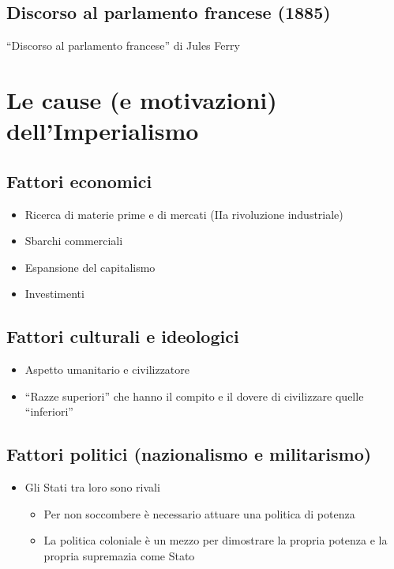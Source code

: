\documentclass{article}
\begin{document}
\subsection{Discorso al parlamento francese (1885)}
“Discorso al parlamento francese” di Jules Ferry

\section{Le cause (e motivazioni) dell’Imperialismo}

\subsection{Fattori economici}
\begin{itemize}
    \item Ricerca di materie prime e di mercati (IIa rivoluzione industriale)
    \item Sbarchi commerciali
    \item Espansione del capitalismo
    \item Investimenti
\end{itemize}

\subsection{Fattori culturali e ideologici}
\begin{itemize}
    \item Aspetto umanitario e civilizzatore
    \item “Razze superiori” che hanno il compito e il dovere di civilizzare quelle “inferiori”
\end{itemize}

\subsection{Fattori politici (nazionalismo e militarismo)}
\begin{itemize}
    \item Gli Stati tra loro sono rivali
    \begin{itemize}
        \item Per non soccombere è necessario attuare una politica di potenza
        \item La politica coloniale è un mezzo per dimostrare la propria potenza e la propria supremazia come Stato
    \end{itemize}
\end{itemize}
\end{document}
